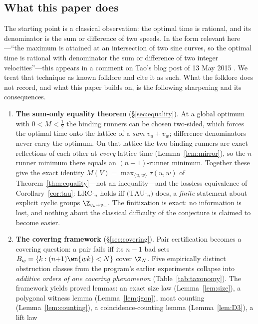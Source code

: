 \subsection{What this paper does}

The starting point is a classical observation: the optimal time is rational,
and its denominator is the sum or difference of two speeds. In the form
relevant here---``the maximum is attained at an intersection of two sine
curves, so the optimal time is rational with denominator the sum or
difference of two integer velocities''---this appears in a comment on Tao's
blog post of 13 May 2015 \cite{Tao-blog}. We treat that technique as known
folklore and cite it as such. What the folklore does not record, and what
this paper builds on, is the following sharpening and its consequences.

\begin{enumerate}[leftmargin=1.6em,itemsep=2pt]
\item \textbf{The sum-only equality theorem}
  (\S\ref{sec:equality}). At a global optimum with $0<M<\tfrac12$ the
  binding runners can be chosen two-sided, which forces the optimal time
  onto the lattice of a \emph{sum} $v_u+v_w$; difference denominators never
  carry the optimum. On that lattice the two binding runners are exact
  reflections of each other at \emph{every} lattice time
  (Lemma~\ref{lem:mirror}), so the $n$-runner minimum there equals an
  $(n{-}1)$-runner minimum. Together these give the exact identity
  $M(V)=\max_{\{u,w\}}\tau(u,w)$ of Theorem~\ref{thm:equality}---not an
  inequality---and the lossless equivalence of
  Corollary~\ref{cor:tau}: $\mathrm{LRC}$-$_n$ holds iff
  $(\mathrm{TAU}$-$_n)$ does, a \emph{finite} statement about explicit
  cyclic groups $\Z_{v_u+v_w}$. The finitization is exact: no information
  is lost, and nothing about the classical difficulty of the conjecture is
  claimed to become easier.
\item \textbf{The covering framework} (\S\ref{sec:covering}). Pair
  certification becomes a covering question: a pair fails iff its $n-1$ bad
  sets $B_w=\{k : (n{+}1)\wn{wk}<N\}$ cover $\Z_N$. Five empirically
  distinct obstruction classes from the program's earlier experiments
  collapse into \emph{additive orders of one covering phenomenon}
  (Table~\ref{tab:taxonomy}). The framework yields proved lemmas: an exact
  size law (Lemma~\ref{lem:size}), a polygonal witness lemma
  (Lemma~\ref{lem:jgon}), moat counting (Lemma~\ref{lem:counting}), a
  coincidence-counting lemma (Lemma~\ref{lem:D3}), a lift law

\end{enumerate}
